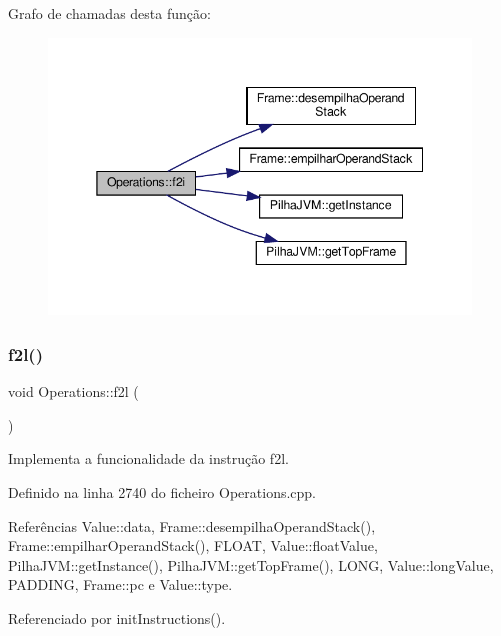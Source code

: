 Grafo de chamadas desta função\+:
\nopagebreak
\begin{figure}[H]
\begin{center}
\leavevmode
\includegraphics[width=345pt]{classOperations_adea8a32fb2ba183d0200ac22e1126fde_cgraph}
\end{center}
\end{figure}
\mbox{\label{classOperations_a175cdab8d092bdd6c27bace9efbcd27e}} 
\subsubsection{\texorpdfstring{f2l()}{f2l()}}
{\footnotesize\ttfamily void Operations\+::f2l (\begin{DoxyParamCaption}{ }\end{DoxyParamCaption})\hspace{0.3cm}{\ttfamily [private]}}



Implementa a funcionalidade da instrução f2l. 



Definido na linha 2740 do ficheiro Operations.\+cpp.



Referências Value\+::data, Frame\+::desempilha\+Operand\+Stack(), Frame\+::empilhar\+Operand\+Stack(), F\+L\+O\+AT, Value\+::float\+Value, Pilha\+J\+V\+M\+::get\+Instance(), Pilha\+J\+V\+M\+::get\+Top\+Frame(), L\+O\+NG, Value\+::long\+Value, P\+A\+D\+D\+I\+NG, Frame\+::pc e Value\+::type.



Referenciado por init\+Instructions().

